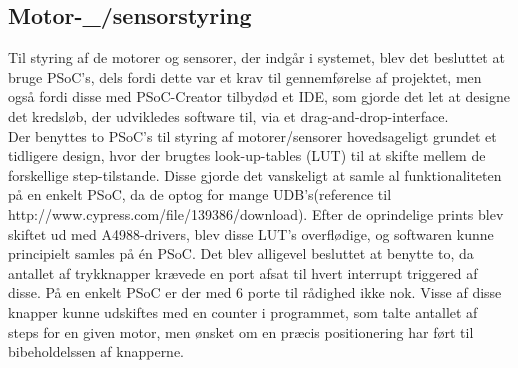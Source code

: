 \subsection{Motor-_/sensorstyring}
Til styring af de motorer og sensorer, der indgår i systemet, blev det besluttet at bruge PSoC's, dels fordi dette var et krav til gennemførelse af projektet, men også fordi disse med PSoC-Creator tilbydød et IDE, som gjorde det let at designe det kredsløb, der udvikledes software til, via et drag-and-drop-interface. \\

Der benyttes to PSoC's til styring af motorer/sensorer hovedsageligt grundet et tidligere design, hvor der brugtes look-up-tables (LUT) til at skifte mellem de forskellige step-tilstande. Disse gjorde det vanskeligt at samle al funktionaliteten på en enkelt PSoC, da de optog for mange UDB's(reference til http://www.cypress.com/file/139386/download). Efter de oprindelige prints blev skiftet ud med A4988-drivers, blev disse LUT's overflødige, og softwaren kunne principielt samles på én PSoC. Det blev alligevel besluttet at benytte to, da antallet af trykknapper krævede en port afsat til hvert interrupt triggered af disse. På en enkelt PSoC er der med 6 porte til rådighed ikke nok. Visse af disse knapper kunne udskiftes med en counter i programmet, som talte antallet af steps for en given motor, men ønsket om en præcis positionering har ført til bibeholdelssen af knapperne.